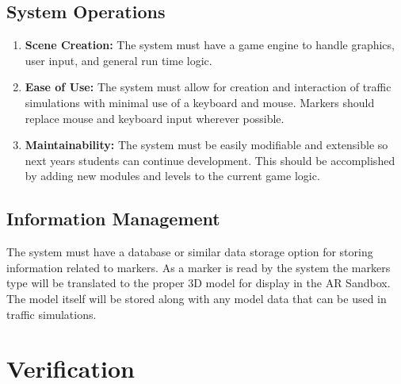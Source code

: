 \documentclass[letterpaper, 10pt, onecolumn, draftclsnofoot]{IEEEtran}
\begin{document}
    \subsection{\textbf{System Operations}}
    \begin{enumerate}[\label={}]         
        \item{\textbf{Scene Creation:} The system must have a game engine to handle graphics, user input, and general run time logic.}
        
        \item{\textbf{Ease of Use:} The system must allow for creation and interaction of traffic simulations with minimal use of a keyboard and mouse. Markers should replace mouse and keyboard input wherever possible.}
        
        \item{\textbf{Maintainability:} The system must be easily modifiable and extensible so next years students can continue development. This should be accomplished by adding new modules and levels to the current game logic.}
    \end{enumerate}
    
    \subsection{\textbf{Information Management}}
    The system must have a database or similar data storage option for storing information related to markers. As a marker is read by the system the markers type will be translated to the proper 3D model for display in the AR Sandbox. The model itself will be stored along with any model data that can be used in traffic simulations. 
    
\section{Verification}
\end{document}
